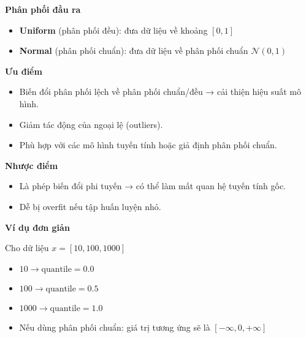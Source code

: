 \textbf{Phân phối đầu ra}

\begin{itemize}
    \item \textbf{Uniform} (phân phối đều): đưa dữ liệu về khoảng \([0, 1]\)
    \item \textbf{Normal} (phân phối chuẩn): đưa dữ liệu về phân phối chuẩn \( \mathcal{N}(0, 1) \)
\end{itemize}

\textbf{Ưu điểm}

\begin{itemize}
    \item Biến đổi phân phối lệch về phân phối chuẩn/đều → cải thiện hiệu suất mô hình.
    \item Giảm tác động của ngoại lệ (outliers).
    \item Phù hợp với các mô hình tuyến tính hoặc giả định phân phối chuẩn.
\end{itemize}

\textbf{Nhược điểm}

\begin{itemize}
    \item Là phép biến đổi phi tuyến → có thể làm mất quan hệ tuyến tính gốc.
    \item Dễ bị overfit nếu tập huấn luyện nhỏ.
\end{itemize}

\textbf{Ví dụ đơn giản}

Cho dữ liệu \( x = [10, 100, 1000] \)

\begin{itemize}
    \item \( 10 \rightarrow \text{quantile} = 0.0 \)
    \item \( 100 \rightarrow \text{quantile} = 0.5 \)
    \item \( 1000 \rightarrow \text{quantile} = 1.0 \)
    \item Nếu dùng phân phối chuẩn: giá trị tương ứng sẽ là \( [-\infty, 0, +\infty] \)
\end{itemize}
